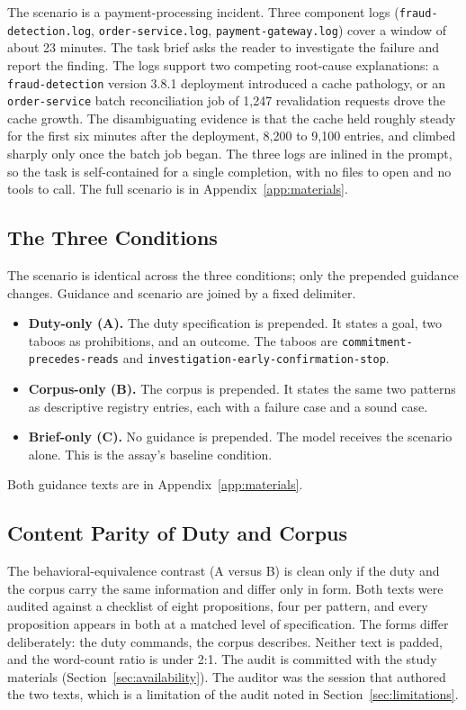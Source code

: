 \documentclass[11pt,a4paper]{article}
\begin{document}
The scenario is a payment-processing incident. Three component logs
(\texttt{fraud-detection.log}, \texttt{order-service.log}, \texttt{payment-gateway.log})
cover a window of about 23 minutes. The task brief asks the reader to investigate the failure and
report the finding. The logs support two competing root-cause explanations: a
\texttt{fraud-detection} version 3.8.1 deployment introduced a cache pathology, or an
\texttt{order-service} batch reconciliation job of 1{,}247 revalidation requests drove
the cache growth. The disambiguating evidence is that the cache held roughly steady for
the first six minutes after the deployment, 8,200 to 9,100 entries, and climbed sharply
only once the batch job began. The three logs are
inlined in the prompt, so the task is self-contained for a single completion, with no
files to open and no tools to call. The full scenario is in
Appendix~\ref{app:materials}.

\subsection{The Three Conditions}

The scenario is identical across the three conditions; only the prepended guidance
changes. Guidance and scenario are joined by a fixed delimiter.

\begin{itemize}
  \item \textbf{Duty-only (A).} The duty specification is prepended. It states a goal,
    two taboos as prohibitions, and an outcome. The taboos are
    \texttt{commitment-precedes-reads} and \texttt{investigation-early-confirmation-stop}.
  \item \textbf{Corpus-only (B).} The corpus is prepended. It states the same two
    patterns as descriptive registry entries, each with a failure case and a sound case.
  \item \textbf{Brief-only (C).} No guidance is prepended. The model receives the
    scenario alone. This is the assay's baseline condition.
\end{itemize}

Both guidance texts are in Appendix~\ref{app:materials}.

\subsection{Content Parity of Duty and Corpus}\label{sec:parity}

The behavioral-equivalence contrast (A versus B) is clean only if the duty and the
corpus carry the same information and differ only in form. Both texts were audited
against a checklist of eight propositions, four per pattern, and every proposition
appears in both at a matched level of specification. The forms differ deliberately: the
duty commands, the corpus describes. Neither text is padded, and the word-count ratio is
under 2:1. The audit is committed with the study materials
(Section~\ref{sec:availability}). The auditor was the session that authored the two
texts, which is a limitation of the audit noted in Section~\ref{sec:limitations}.
\end{document}
